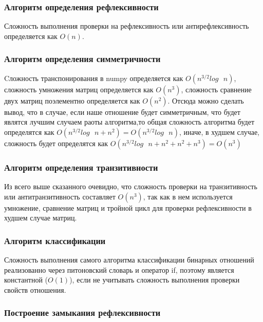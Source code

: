 \documentclass[spec, och, labwork]{shiza}
\begin{document}
        \subsubsection{Алгоритм определения рефлексивности}

            Сложность выполнения проверки на рефлексивность или антирефлексивность определяется как $O(n)$.

        \subsubsection{Алгоритм определения симметричности}

            Cложность транспонирования в numpy определяется как $O(n^{3/2}log \text{ } n)$, сложность умножения матриц 
            определяется как $O(n^3)$, сложность сравнение двух матриц поэлементно определяется как $O(n^2)$. 
            Отсюда можно сделать вывод, что в случае, если наше отношение будет симметричным,
            что будет являтся лучшим случаем раоты алгоритма,то общая сложность алгоритма будет определятся как 
            $O(n^{3/2}log \text{ } n + n^2) = O(n^{3/2}log \text{ } n)$,
            иначе, в худшем случае, сложность будет определятся как $O(n^{3/2}log \text{ } n + n^2 + n^2 + n^3) = O(n^3)$

        \subsubsection{Алгоритм определения транзитивности}

            Из всего выше сказанного очевидно, что сложность проверки на транзитивность или антитранзитивность составляет $O(n^3)$,
            так как в нем используется умножение, сравнение матриц и тройной цикл для проверки рефлексивности в худшем случае матриц.

        \subsubsection{Алгоритм классификации}
            Сложность выполнения самого алгоритма классификации бинарных отношений реализованно через питоновский словарь 
            и оператор if, поэтому является константной ($O(1)$), если не учитывать сложность выполнения проверки свойств отношения.

        \subsubsection{Построение замыкания рефлексивности}
        
\end{document}
